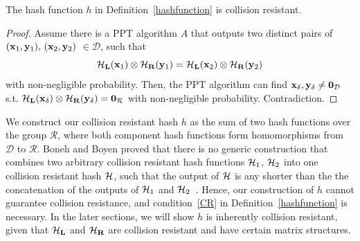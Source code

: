 \begin{corol}
The hash function $h$ in Definition~\ref{hashfunction} is collision resistant.
\end{corol}
\begin{proof}
Assume there is a PPT algorithm $A$ that outputs two distinct pairs of $ ({\bf x}_{1},{\bf y}_{1}), \, ({\bf x}_{2}, {\bf y}_{2}) $ $\in \mathcal{D}$, such that $${\bf {\cal H}_{L}}({\bf x}_{1}) \otimes {\bf {\cal H}_{R}}({\bf y}_{1}) ={\bf {\cal H}_{L}}({\bf x}_{2}) \otimes {\bf {\cal H}_{R}}({\bf y}_{2})$$with non-negligible probability. Then, the PPT algorithm can find $\bf x_{\delta}, y_{\delta} \neq 0_{\mathcal{D}}$ s.t. $\bf {\cal H}_{L}(x_{\delta}) \otimes {\cal H}_{R}(y_{\delta}) = 0_{\mathcal{R}}$ with non-negligible probability. Contradiction.
\end{proof}

We construct our collision resistant hash $h$ as the sum of two hash functions over the group $\mathcal{R}$, where both component hash functions form homomorphisms from $\mathcal{D}$ to $\mathcal{R}$. Boneh and Boyen proved that there is no generic construction that combines two arbitrary collision resistant hash functions ${\bf {\cal H}}_{1}$, ${\bf {\cal H}}_{2}$ into one collision resistant hash ${\bf {\cal H}}$, such that the output of ${\bf {\cal H}}$ is any shorter than the the concatenation of the outputs of ${\bf {\cal H}}_{1}$ and ${\bf {\cal H}}_{2}$~\cite{Boneh06}. Hence, our construction of $h$ cannot guarantee collision resistance, and condition~\ref{CR} in Definition~\ref{hashfunction} is necessary. In the later sections, we will show $h$ is inherently collision resistant, given that ${\bf {\cal H}_{L}}$ and ${\bf {\cal H}_{R}}$ are collision resistant and have certain matrix structures.


